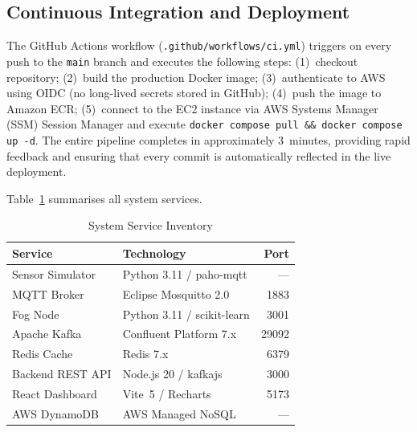 \documentclass[conference]{IEEEtran}
\begin{document}
\subsection{Continuous Integration and Deployment}

The GitHub Actions workflow (\texttt{.github/workflows/ci.yml}) triggers
on every push to the \texttt{main} branch and executes the following steps:
(1)~checkout repository; (2)~build the production Docker image;
(3)~authenticate to AWS using OIDC (no long-lived secrets stored in GitHub);
(4)~push the image to Amazon ECR; (5)~connect to the EC2 instance via AWS
Systems Manager (SSM) Session Manager and execute
\texttt{docker compose pull \&\& docker compose up -d}. The entire pipeline
completes in approximately 3~minutes, providing rapid feedback and ensuring
that every commit is automatically reflected in the live deployment.

Table~\ref{tab:services} summarises all system services.

\begin{table}[H]
  \caption{System Service Inventory}
  \label{tab:services}
  \centering
  \renewcommand{\arraystretch}{1.2}
  \begin{tabular}{p{2.3cm} p{3.0cm} r}
    \toprule
    \textbf{Service}       & \textbf{Technology}           & \textbf{Port} \\
    \midrule
    Sensor Simulator       & Python 3.11 / paho-mqtt       & ---           \\
    MQTT Broker            & Eclipse Mosquitto 2.0         & 1883          \\
    Fog Node               & Python 3.11 / scikit-learn    & 3001          \\
    Apache Kafka           & Confluent Platform 7.x        & 29092         \\
    Redis Cache            & Redis 7.x                     & 6379          \\
    Backend REST API       & Node.js 20 / kafkajs          & 3000          \\
    React Dashboard        & Vite~5 / Recharts             & 5173          \\
    AWS DynamoDB           & AWS Managed NoSQL             & ---           \\
    \bottomrule
  \end{tabular}
\end{table}

\end{document}
